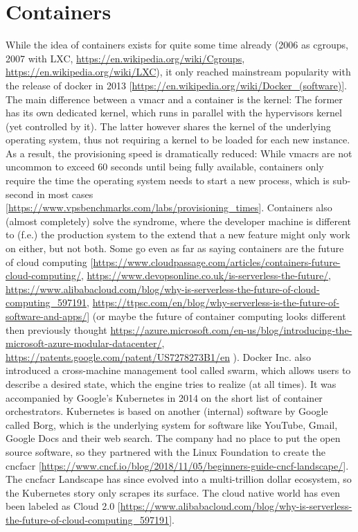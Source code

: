 \section{Containers}
While the idea of containers exists for quite some time already (2006 as cgroups, 2007 with LXC, \url{https://en.wikipedia.org/wiki/Cgroups}, \url{https://en.wikipedia.org/wiki/LXC}), it only reached mainstream popularity with the release of docker in 2013 [\url{https://en.wikipedia.org/wiki/Docker_(software)}]. The main difference between a \gls{vmacr} and a container is the kernel: The former has its own dedicated kernel, which runs in parallel with the hypervisors kernel (yet controlled by it). The latter however shares the kernel of the underlying operating system, thus not requiring a kernel to be loaded for each new instance. As a result, the provisioning speed is dramatically reduced: While \gls{vmacr}s are not uncommon to exceed 60 seconds until being fully available, containers only require the time the operating system needs to start a new process, which is sub-second in most cases [\url{https://www.vpsbenchmarks.com/labs/provisioning_times}].
\newline
Containers also (almost completely) solve the  syndrome, where the developer machine is different to (f.e.) the production system to the extend that a new feature might only work on either, but not both.
\newline
Some go even as far as saying containers are the future of cloud computing [\url{https://www.cloudpassage.com/articles/containers-future-cloud-computing/}, \url{https://www.devopsonline.co.uk/is-serverless-the-future/}, \url{https://www.alibabacloud.com/blog/why-is-serverless-the-future-of-cloud-computing_597191}, \url{https://ttpsc.com/en/blog/why-serverless-is-the-future-of-software-and-apps/}] (or maybe the future of container computing looks different then previously thought \url{https://azure.microsoft.com/en-us/blog/introducing-the-microsoft-azure-modular-datacenter/}, \url{https://patents.google.com/patent/US7278273B1/en} ).
\newline
Docker Inc. also introduced a cross-machine management tool called swarm, which allows users to describe a desired state, which the engine tries to realize (at all times). It was accompanied by Google's Kubernetes in 2014 on the short list of container orchestrators. Kubernetes is based on another (internal) software by Google called Borg, which is the underlying system for software like YouTube, Gmail, Google Docs and their web search. The company had no place to put the open source software, so they partnered with the Linux Foundation to create the \gls{cncfacr} [\url{https://www.cncf.io/blog/2018/11/05/beginners-guide-cncf-landscape/}]. The \gls{cncfacr} Landscape has since evolved into a multi-trillion dollar ecosystem, so the Kubernetes story only scrapes its surface. The cloud native world has even been labeled as Cloud 2.0 [\url{https://www.alibabacloud.com/blog/why-is-serverless-the-future-of-cloud-computing_597191}].
